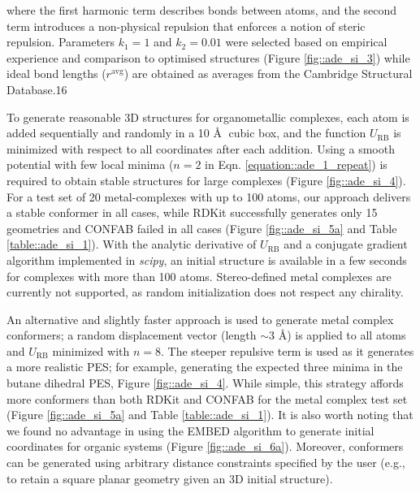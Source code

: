 \documentclass[../../main.tex]{subfiles}
\begin{document}
where the first harmonic term describes bonds between atoms, and the second term introduces a non-physical repulsion that enforces a notion of steric repulsion. Parameters $k_1 = 1$ and $k_2 = 0.01$ were selected based on empirical experience and comparison to optimised structures (Figure \ref{fig::ade_si_3}) while ideal bond lengths ($r^\text{avg}$) are obtained as averages from the Cambridge Structural Database.16

To generate reasonable 3D structures for organometallic complexes, each atom is added sequentially and randomly in a 10 \AA$\;$ cubic box, and the function $U_\text{RB}$ is minimized with respect to all coordinates after each addition. Using a smooth potential with few local minima ($n = 2$ in Eqn. \eqref{equation::ade_1_repeat}) is required to obtain stable structures for large complexes (Figure \ref{fig::ade_si_4}). For a test set of 20 metal-complexes with up to 100 atoms, our approach delivers a stable conformer in all cases, while RDKit successfully generates only 15 geometries and CONFAB failed in all cases (Figure \ref{fig::ade_si_5a} and Table \ref{table::ade_si_1}). With the analytic derivative of $U_\text{RB}$ and a conjugate gradient algorithm implemented in \emph{scipy},\cite{SciPy} an initial structure is available in a few seconds for complexes with more than 100 atoms. Stereo-defined metal complexes are currently not supported, as random initialization does not respect any chirality.

An alternative and slightly faster approach is used to generate metal complex conformers; a random displacement vector (length $\sim3$ \AA) is applied to all atoms and $U_\text{RB}$ minimized with $n = 8$. The steeper repulsive term is used as it generates a more realistic PES; for example, generating the expected three minima in the butane dihedral PES, Figure \ref{fig::ade_si_4}. While simple, this strategy affords more conformers than both RDKit and CONFAB for the metal complex test set (Figure \ref{fig::ade_si_5a} and Table \ref{table::ade_si_1}). It is also worth noting that we found no advantage in using the EMBED algorithm\cite{Havel2002} to generate initial coordinates for organic systems (Figure \ref{fig::ade_si_6a}). Moreover, conformers can be generated using arbitrary distance constraints specified by the user (e.g., to retain a square planar geometry given an 3D initial structure).
\end{document}
